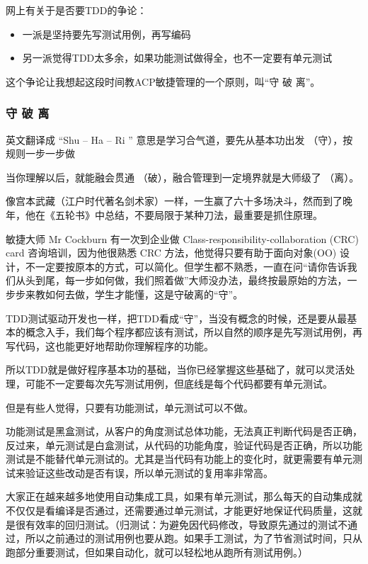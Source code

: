 网上有关于是否要TDD的争论：

\begin{itemize}
\tightlist
\item
  一派是坚持要先写测试用例，再写编码
\item
  另一派觉得TDD太多余，如果功能测试做得全，也不一定要有单元测试
\end{itemize}

这个争论让我想起这段时间教ACP敏捷管理的一个原则，叫“守 破 离”。

\hypertarget{ux5b88-ux7834-ux79bb}{%
\subsubsection{守 破 离}\label{ux5b88-ux7834-ux79bb}}

英文翻译成 ``Shu -- Ha -- Ri '' 意思是学习合气道，要先从基本功出发
（守），按规则一步一步做

当你理解以后，就能融会贯通 （破），融合管理到一定境界就是大师级了
（离）。

像宫本武藏（江户时代著名剑术家）一样，一生赢了六十多场决斗，然而到了晚年，他在《五轮书》中总结，不要局限于某种刀法，最重要是抓住原理。

敏捷大师 Mr Cockburn 有一次到企业做 Class-responsibility-collaboration
(CRC) card 咨询培训，因为他很熟悉 CRC 方法，他觉得只要有助于面向对象(OO)
设计，不一定要按原本的方式，可以简化。但学生都不熟悉，一直在问``请你告诉我们从头到尾，每一步如何做，我们照着做''大师没办法，最终按最原始的方法，一步步来教如何去做，学生才能懂，这是守破离的``守''。

TDD测试驱动开发也一样，把TDD看成``守''，当没有概念的时候，还是要从最基本的概念入手，我们每个程序都应该有测试，所以自然的顺序是先写测试用例，再写代码，这也能更好地帮助你理解程序的功能。

所以TDD就是做好程序基本功的基础，当你已经掌握这些基础了，就可以灵活处理，可能不一定要每次先写测试用例，但底线是每个代码都要有单元测试。

但是有些人觉得，只要有功能测试，单元测试可以不做。

功能测试是黑盒测试，从客户的角度测试总体功能，无法真正判断代码是否正确，反过来，单元测试是白盒测试，从代码的功能角度，验证代码是否正确，所以功能测试是不能替代单元测试的。尤其是当代码有功能上的变化时，就更需要有单元测试来验证这些改动是否有误，所以单元测试的复用率非常高。

大家正在越来越多地使用自动集成工具，如果有单元测试，那么每天的自动集成就不仅仅是看编译是否通过，还需要通过单元测试，才能更好地保证代码质量，这就是很有效率的回归测试。（归测试：为避免因代码修改，导致原先通过的测试不通过，所以之前通过的测试用例也要从跑。如果手工测试，为了节省测试时间，只从跑部分重要测试，但如果自动化，就可以轻松地从跑所有测试用例。）


